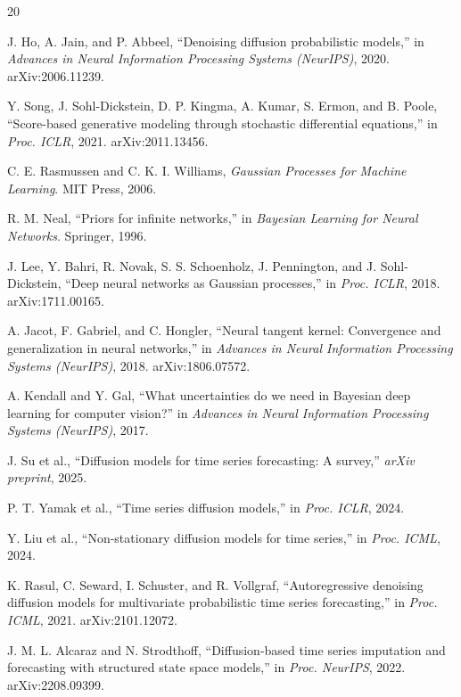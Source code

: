 \documentclass[conference]{IEEEtran}
\begin{document}
\begin{thebibliography}{20}

 J. Ho, A. Jain, and P. Abbeel, ``Denoising diffusion probabilistic models,'' in \textit{Advances in Neural Information Processing Systems (NeurIPS)}, 2020. arXiv:2006.11239.

 Y. Song, J. Sohl-Dickstein, D. P. Kingma, A. Kumar, S. Ermon, and B. Poole, ``Score-based generative modeling through stochastic differential equations,'' in \textit{Proc. ICLR}, 2021. arXiv:2011.13456.

 C. E. Rasmussen and C. K. I. Williams, \textit{Gaussian Processes for Machine Learning}. MIT Press, 2006.

 R. M. Neal, ``Priors for infinite networks,'' in \textit{Bayesian Learning for Neural Networks}. Springer, 1996.

 J. Lee, Y. Bahri, R. Novak, S. S. Schoenholz, J. Pennington, and J. Sohl-Dickstein, ``Deep neural networks as Gaussian processes,'' in \textit{Proc. ICLR}, 2018. arXiv:1711.00165.

 A. Jacot, F. Gabriel, and C. Hongler, ``Neural tangent kernel: Convergence and generalization in neural networks,'' in \textit{Advances in Neural Information Processing Systems (NeurIPS)}, 2018. arXiv:1806.07572.

 A. Kendall and Y. Gal, ``What uncertainties do we need in Bayesian deep learning for computer vision?'' in \textit{Advances in Neural Information Processing Systems (NeurIPS)}, 2017.

 J. Su et al., ``Diffusion models for time series forecasting: A survey,'' \textit{arXiv preprint}, 2025.

 P. T. Yamak et al., ``Time series diffusion models,'' in \textit{Proc. ICLR}, 2024.

 Y. Liu et al., ``Non-stationary diffusion models for time series,'' in \textit{Proc. ICML}, 2024.

 K. Rasul, C. Seward, I. Schuster, and R. Vollgraf, ``Autoregressive denoising diffusion models for multivariate probabilistic time series forecasting,'' in \textit{Proc. ICML}, 2021. arXiv:2101.12072.

 J. M. L. Alcaraz and N. Strodthoff, ``Diffusion-based time series imputation and forecasting with structured state space models,'' in \textit{Proc. NeurIPS}, 2022. arXiv:2208.09399.


\end{thebibliography}
\end{document}
